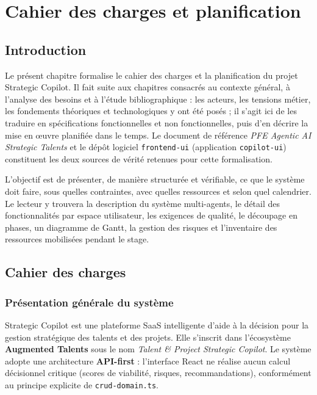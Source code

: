 \chapter{Cahier des charges et planification}

\section{Introduction}

Le présent chapitre formalise le cahier des charges et la planification du projet Strategic Copilot. Il fait suite aux chapitres consacrés au contexte général, à l'analyse des besoins et à l'étude bibliographique : les acteurs, les tensions métier, les fondements théoriques et technologiques y ont été posés ; il s'agit ici de les traduire en spécifications fonctionnelles et non fonctionnelles, puis d'en décrire la mise en œuvre planifiée dans le temps. Le document de référence \emph{PFE Agentic AI Strategic Talents} et le dépôt logiciel \texttt{frontend-ui} (application \texttt{copilot-ui}) constituent les deux sources de vérité retenues pour cette formalisation.

L'objectif est de présenter, de manière structurée et vérifiable, ce que le système doit faire, sous quelles contraintes, avec quelles ressources et selon quel calendrier. Le lecteur y trouvera la description du système multi-agents, le détail des fonctionnalités par espace utilisateur, les exigences de qualité, le découpage en phases, un diagramme de Gantt, la gestion des risques et l'inventaire des ressources mobilisées pendant le stage.

\section{Cahier des charges}

\subsection{Présentation générale du système}

Strategic Copilot est une plateforme SaaS intelligente d'aide à la décision pour la gestion stratégique des talents et des projets. Elle s'inscrit dans l'écosystème \textbf{Augmented Talents} sous le nom \emph{Talent \& Project Strategic Copilot}. Le système adopte une architecture \textbf{API-first} : l'interface React ne réalise aucun calcul décisionnel critique (scores de viabilité, risques, recommandations), conformément au principe explicite de \texttt{crud-domain.ts}.

